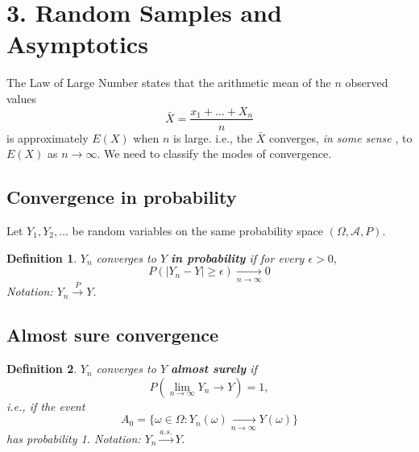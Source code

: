 \documentclass[12pt]{report} \addtolength{\textheight}{2in}
\newtheorem{defn}{Definition}
\newcommand{\bigA}{\mathcal{A}}
\newcommand{\probsp}{(\Omega, \bigA, P)}
\begin{document}
\section*{3. Random Samples and Asymptotics}
\begin{description}
\item[Summary:]
\item
 The Law of Large Number states that the arithmetic mean of the $n$ observed values 
\begin{displaymath} \bar{X}= \frac{x_1 + \dots + X_n}{n}
\end{displaymath}
is approximately $E(X)$ when $n$ is large. i.e., the $\bar{X}$ converges, \textit{ in some sense} , to $E(X)$ as $n \to \infty.$ We need to classify the modes of convergence. 
\end{description}

\subsection*{Convergence in probability}
Let $Y_1,Y_2,\dots$ be random variables on the same probability space $\probsp.$
\begin{defn}
$Y_n$ converges to $Y$ \textbf{in probability} if for every $\epsilon > 0,$
\begin{displaymath}
P(|Y_n-Y|\geq \epsilon)\underset{n \to \infty} {\longrightarrow} 0
\end{displaymath}
Notation: $Y_n \overset{P}{\longrightarrow}Y$.
\end{defn}
\subsection*{Almost sure convergence}
\begin{defn}
$Y_n$ converges to $Y$ \textbf{almost surely} if 
\begin{displaymath}
P(\lim_{n\to\infty} Y_n {\longrightarrow}Y) =1,
\end{displaymath} i.e., if the event
\begin{displaymath}
A_0=\{\omega\in\Omega: Y_n(\omega)\underset{n\to\infty} {\longrightarrow} Y(\omega) \}
\end{displaymath}
has probability 1. Notation: $Y_n \overset{a.s.}{\longrightarrow}Y.$
\end{defn}
\end{document}

